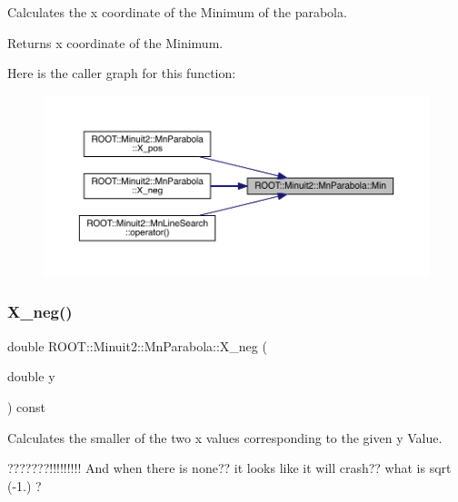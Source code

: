 Calculates the x coordinate of the Minimum of the parabola.

\begin{DoxyReturn}{Returns}
x coordinate of the Minimum. 
\end{DoxyReturn}
Here is the caller graph for this function\+:\nopagebreak
\begin{figure}[H]
\begin{center}
\leavevmode
\includegraphics[width=350pt]{db/d7d/classROOT_1_1Minuit2_1_1MnParabola_ab3c7e51f6276d9ebf6d28fe965914bc8_icgraph}
\end{center}
\end{figure}
\mbox{\label{classROOT_1_1Minuit2_1_1MnParabola_a16f7f02dd1cb070e89fb007331066ee3}} 
\subsubsection{\texorpdfstring{X\_neg()}{X\_neg()}\hspace{0.1cm}{\footnotesize\ttfamily [1/2]}}
{\footnotesize\ttfamily double R\+O\+O\+T\+::\+Minuit2\+::\+Mn\+Parabola\+::\+X\+\_\+neg (\begin{DoxyParamCaption}\item[{double}]{y }\end{DoxyParamCaption}) const\hspace{0.3cm}{\ttfamily [inline]}}

Calculates the smaller of the two x values corresponding to the given y Value.

???????!!!!!!!!! And when there is none?? it looks like it will crash?? what is sqrt (-\/1.) ?


